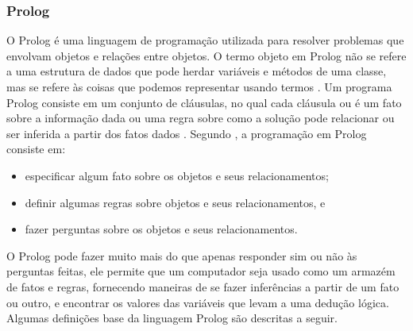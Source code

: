 \subsubsection{Prolog}
O Prolog é uma linguagem de programação utilizada para resolver problemas que envolvam objetos e relações entre objetos. O termo objeto em Prolog não se refere a uma estrutura de dados que pode herdar variáveis e métodos de uma classe, mas se refere às coisas que podemos representar usando termos \cite{clocksin2003programming}.
Um programa Prolog consiste em um conjunto de cláusulas, no qual cada cláusula ou é um fato sobre a informação dada ou uma regra sobre como a solução pode relacionar ou ser inferida a partir dos fatos dados \cite{clocksin2003programming}.
Segundo \cite{clocksin2003programming}, a programação em Prolog consiste em: 
\begin{itemize}
\item especificar algum fato sobre os objetos e seus relacionamentos;
\item definir algumas regras sobre objetos e seus relacionamentos, e
\item fazer perguntas sobre os objetos e seus relacionamentos.
\end{itemize}
O Prolog pode fazer muito mais do que apenas responder sim ou não às perguntas feitas, ele permite que um computador seja usado como um armazém de fatos e regras, fornecendo maneiras de se fazer inferências a partir de um fato ou outro, e encontrar os valores das variáveis que levam a uma dedução lógica.
Algumas definições base da linguagem Prolog são descritas a seguir.
